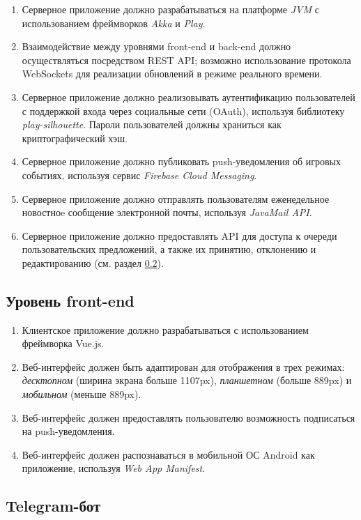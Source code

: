 \documentclass[12pt, a4paper]{article}
\begin{document}
\begin{enumerate}
\item Серверное приложение должно разрабатываться на платформе \textit{JVM}
с использованием фреймворков \textit{Akka} и \textit{Play}.
\item Взаимодействие между уровнями front-end и back-end должно осуществляться
посредством REST API; возможно использование протокола WebSockets для реализации
обновлений в режиме реального времени.
\item Серверное приложение должно реализовывать аутентификацию пользователей
с поддержкой входа через социальные сети (OAuth), используя библиотеку
\textit{play-silhouette}. Пароли пользователей должны храниться как
криптографический хэш.
\item Серверное приложение должно публиковать push-уведомления об игровых событиях,
используя сервис \textit{Firebase Cloud Messaging}.
\item Серверное приложение должно отправлять пользователям еженедельное новостноe
сообщение электронной почты, используя \textit{JavaMail API}.
\item Серверное приложение должно предоставлять API для доступа к очереди
пользовательских предложений, а также их принятию, отклонению и редактированию
(см. раздел \ref{telegram-bot}).
\end{enumerate}

\subsection{Уровень front-end}

\begin{enumerate}
\item Клиентское приложение должно разрабатываться с использованием фреймворка Vue.js.
\item Веб-интерфейс должен быть адаптирован для отображения в трех режимах:
\textit{десктопном} (ширина экрана больше 1107px),
\textit{планшетном} (больше 889px) и \textit{мобильном} (меньше 889px).
\item Веб-интерфейс должен предоставлять пользователю возможность подписаться на
push-уведомления.
\item Веб-интерфейс должен распознаваться в мобильной ОС Android как
приложение, используя \textit{Web App Manifest}.
\end{enumerate}

\subsection{Telegram-бот}
\label{telegram-bot}
\end{document}
